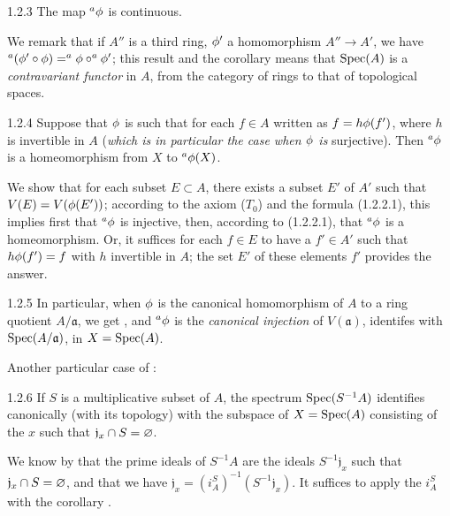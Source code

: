 \documentclass[10pt,oneside]{book}
\begin{document}
\begin{envs}[Corollary]{1.2.3}
\label{cor-1.1.2.3}
The map $^a\phi$ is continuous.
\end{envs}

We remark that if $A''$ is a third ring, $\phi'$ a homomorphism $A''\to A'$, we have
$^a(\phi'\circ\phi)= ^a\phi\circ ^a\phi'$; this result and the corollary
 means that ${\mathop{\mathrm{Spec}}\nolimits}(A)$ is a \emph{contravariant functor} in $A$, from the
category of rings to that of topological spaces.

\begin{envs}[Corollary]{1.2.4}
\label{cor-1.1.2.4}
Suppose that $\phi$ is such that for each $f\in A$ written as $f=h\phi(f')$, where $h$ is
invertible in $A$ (\emph{which is in particular the case when $\phi$ is} surjective). Then
$^a\phi$ is a homeomorphism from $X$ to $^a\phi(X)$.
\end{envs}

We show that for each subset $E\subset A$, there exists a subset $E'$ of $A'$ such that
$V(E)=V(\phi(E'))$; according to the axiom ($T_0$)  and the formula
(1.2.2.1), this implies first that $^a\phi$ is injective, then, according to (1.2.2.1),
that $^a\phi$ is a homeomorphism. Or, it suffices for each $f\in E$ to have a $f'\in A'$
such that $h\phi(f')=f$ with $h$ invertible in $A$; the set $E'$ of these elements $f'$
provides the answer.

\begin{env}{1.2.5}
\label{env-1.1.2.5}
In particular, when $\phi$ is the canonical homomorphism of $A$ to a ring quotient
$A/\mathfrak{a}$, we get , and $^a\phi$ is the \emph{canonical injection}
of $V(\mathfrak{a})$, identifes with ${\mathop{\mathrm{Spec}}\nolimits}(A/\mathfrak{a})$, in $X={\mathop{\mathrm{Spec}}\nolimits}(A)$.
\end{env}

Another particular case of :
\begin{envs}[Corollary]{1.2.6}
\label{cor-1.1.2.6}
If $S$ is a multiplicative subset of $A$, the spectrum ${\mathop{\mathrm{Spec}}\nolimits}(S^{-1}A)$ identifies
canonically (with its topology) with the subspace of $X={\mathop{\mathrm{Spec}}\nolimits}(A)$ consisting of the $x$
such that $\mathfrak{j}_x\cap S=\varnothing$.
\end{envs}

We know by  that the prime ideals of $S^{-1}A$ are the ideals
$S^{-1}\mathfrak{j}_x$ such that $\mathfrak{j}_x\cap S=\varnothing$, and that we have
$\mathfrak{j}_x=(i_A^S)^{-1}(S^{-1}\mathfrak{j}_x)$. It suffices to apply the $i_A^S$
with the corollary .
\end{document}
